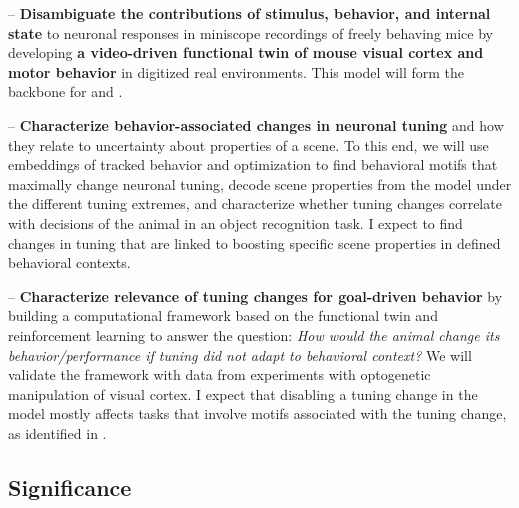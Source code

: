 \documentclass[COG,11pt]{ercgrant}
\begin{document}
     -- \textbf{Disambiguate the contributions of stimulus, behavior, and internal state} to neuronal responses in miniscope recordings of freely behaving mice  by developing \textbf{a video-driven functional twin of mouse visual cortex and motor behavior} in digitized real environments. This model will form the backbone for  and . 
    
     -- \textbf{Characterize behavior-associated changes in neuronal tuning} and how they relate to uncertainty about properties of a scene. 
    To this end, we will use embeddings of tracked behavior and optimization to find behavioral motifs that maximally change neuronal tuning, decode scene properties from the model under the different tuning extremes, and characterize whether tuning changes correlate with decisions of the animal in an object recognition task. 
    I expect to find changes in tuning that are linked to boosting specific scene properties in defined behavioral contexts. 
    
     -- \textbf{Characterize relevance of tuning changes for goal-driven behavior} by building a computational framework based on the functional twin and reinforcement learning to answer the question: \textit{How would the animal change its behavior/performance if tuning did not adapt to behavioral context?} We will validate the framework with data from experiments with optogenetic manipulation of visual cortex. I expect that disabling a tuning change in the model mostly affects tasks that involve motifs associated with the tuning change, as identified in .

\subsection{Significance}
\end{document}
